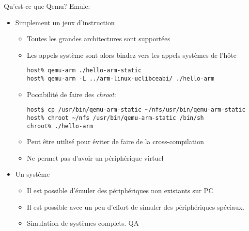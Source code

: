 \begin{frame}[fragile=singleslide]{Qu'est-ce que Qemu?}
  Emule:
  \begin{itemize}
  \item Simplement un jeux d'instruction
    \begin{itemize}
    \item Toutes les grandes architectures sont supportées
    \item  Les  appels  système  sont  alors bindez  vers  les  appels
      systèmes de l'hôte
      \begin{lstlisting}
host% qemu-arm ./hello-arm-static
host% qemu-arm -L ../arm-linux-uclibceabi/ ./hello-arm
      \end{lstlisting}
    \item Poccibilité de faire des \emph{chroot}:
      \begin{lstlisting}
host$ cp /usr/bin/qemu-arm-static ~/nfs/usr/bin/qemu-arm-static
host% chroot ~/nfs /usr/bin/qemu-arm-static /bin/sh
chroot% ./hello-arm
      \end{lstlisting}
    \item Peut être utilisé pour éviter de faire de la cross-compilation
    \item Ne permet pas d'avoir un périphérique virtuel
    \end{itemize}
  \item Un système
    \begin{itemize}
    \item Il est possible  d'émuler des périphériques non existants sur
      PC
    \item  Il  est  possible  avec  un peu  d'effort  de  simuler  des
      périphériques spéciaux.
    \item Simulation de systèmes complets. QA
    \end{itemize}
  \end{itemize}
\end{frame}

